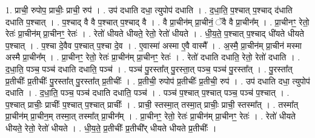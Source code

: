 \documentclass[17pt]{extarticle}
\begin{document}
1. प्राची॒ रुपोप॒ प्राचीः॒ प्राची॒ रुप॑ । . उप॑ दधाति दधा॒ त्युपोप॑ दधाति । . द॒धा॒ति॒ प॒श्चात् प॒श्चाद् द॑धाति दधाति प॒श्चात् । . प॒श्चाद् वै वै प॒श्चात् प॒श्चाद् वै । . वै प्रा॒चीन॑म् प्रा॒चीनं॒ ॅवै वै प्रा॒चीन᳚म् । . प्रा॒चीनꣳ॒॒ रेतो॒ रेतः॑ प्रा॒चीन॑म् प्रा॒चीनꣳ॒॒ रेतः॑ । . रेतो॑ धीयते धीयते॒ रेतो॒ रेतो॑ धीयते । . धी॒य॒ते॒ प॒श्चात् प॒श्चाद् धी॑यते धीयते प॒श्चात् । . प॒श्चा दे॒वैव प॒श्चात् प॒श्चा दे॒व । . ए॒वास्मा॑ अस्मा ए॒वै वास्मै᳚ । . अ॒स्मै॒ प्रा॒चीन॑म् प्रा॒चीन॑ मस्मा अस्मै प्रा॒चीन᳚म् । . प्रा॒चीनꣳ॒॒ रेतो॒ रेतः॑ प्रा॒चीन॑म् प्रा॒चीनꣳ॒॒ रेतः॑ । . रेतो॑ दधाति दधाति॒ रेतो॒ रेतो॑ दधाति । . द॒धा॒ति॒ पञ्च॒ पञ्च॑ दधाति दधाति॒ पञ्च॑ । . पञ्च॑ पु॒रस्ता᳚त् पु॒रस्ता॒त् पञ्च॒ पञ्च॑ पु॒रस्ता᳚त् । . पु॒रस्ता᳚त् प्र॒तीचीः᳚ प्र॒तीचीः᳚ पु॒रस्ता᳚त् पु॒रस्ता᳚त् प्र॒तीचीः᳚ । . प्र॒तीची॒ रुपोप॑ प्र॒तीचीः᳚ प्र॒तीची॒ रुप॑ । . उप॑ दधाति दधा॒ त्युपोप॑ दधाति । . द॒धा॒ति॒ पञ्च॒ पञ्च॑ दधाति दधाति॒ पञ्च॑ । . पञ्च॑ प॒श्चात् प॒श्चात् पञ्च॒ पञ्च॑ प॒श्चात् । . प॒श्चात् प्राचीः॒ प्राचीः᳚ प॒श्चात् प॒श्चात् प्राचीः᳚ । . प्राची॒ स्तस्मा॒त् तस्मा॒त् प्राचीः॒ प्राची॒ स्तस्मा᳚त् । . तस्मा᳚त् प्रा॒चीन॑म् प्रा॒चीन॒म् तस्मा॒त् तस्मा᳚त् प्रा॒चीन᳚म् । . प्रा॒चीनꣳ॒॒ रेतो॒ रेतः॑ प्रा॒चीन॑म् प्रा॒चीनꣳ॒॒ रेतः॑ । . रेतो॑ धीयते धीयते॒ रेतो॒ रेतो॑ धीयते । . धी॒य॒ते॒ प्र॒तीचीः᳚ प्र॒तीची᳚र् धीयते धीयते प्र॒तीचीः᳚ । \newline
\end{document}
